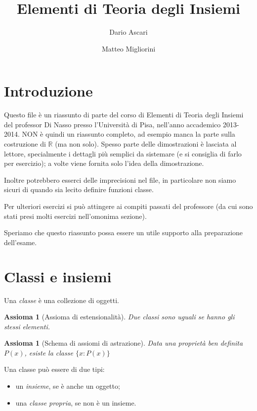 \documentclass[a4paper,10pt,oneside]{article}
\title{Elementi di Teoria degli Insiemi}
\author{Dario Ascari \and Matteo Migliorini}
\date{}
\newcommand{\myname}[1]{\emph{#1}}
\theoremstyle{plain}
\newtheorem{myax}[mytheorem]{Assioma}
\theoremstyle{definition}
\theoremstyle{remark}
\begin{document}
\maketitle

\cleardoublepage

\section*{Introduzione}
Questo file è un riassunto di parte del corso di Elementi di Teoria degli Insiemi del professor Di Nasso presso l'Università di Pisa, nell'anno accademico 2013-2014. NON è quindi un riassunto completo, ad esempio manca la parte sulla costruzione di $\mathbb R$ (ma non solo). Spesso parte delle dimostrazioni è lasciata al lettore, specialmente i dettagli più semplici da sistemare (e si consiglia di farlo per esercizio); a volte viene fornita solo l'idea della dimostrazione.

Inoltre potrebbero esserci delle imprecisioni nel file, in particolare non siamo sicuri di quando sia lecito definire funzioni classe. 

Per ulteriori esercizi si può attingere ai compiti passati del professore (da cui sono stati presi molti esercizi nell'omonima sezione).

Speriamo che questo riassunto possa essere un utile supporto alla preparazione dell'esame.
\cleardoublepage

\tableofcontents
\cleardoublepage




\section{Classi e insiemi}

Una \myname{classe} è una collezione di oggetti. 

\begin{myax}[Assioma di estensionalità]
 Due classi sono uguali se hanno gli stessi elementi.
\end{myax}
\begin{myax}[Schema di assiomi di astrazione]
 Data una proprietà ben definita $P(x)$, esiste la classe $\{x: P(x)\}$
\end{myax}

Una classe può essere di due tipi:

\begin{itemize}
 \item un \myname{insieme}, se è anche un oggetto;
 \item una \myname{classe propria}, se non è un insieme.
\end{itemize}
\end{document}

